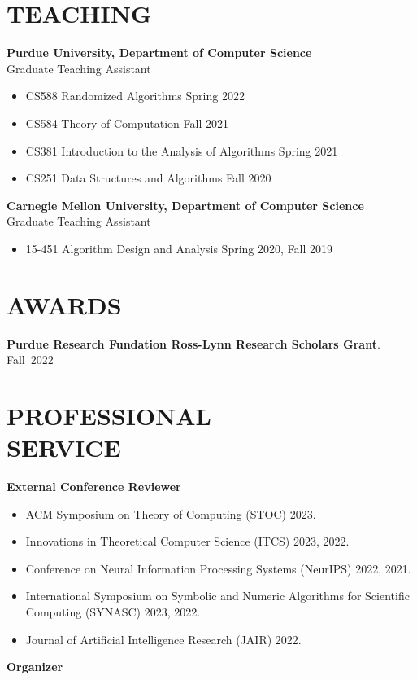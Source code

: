 \documentclass[margin, 10pt]{res} %
\begin{document}
\begin{resume}
\section{TEACHING}

{\bf Purdue University, Department of Computer Science}\\
Graduate Teaching Assistant

\begin{itemize}
\item CS588 Randomized Algorithms \hfill Spring 2022
\item CS584 Theory of Computation \hfill Fall 2021
\item CS381 Introduction to the Analysis of Algorithms \hfill Spring 2021
\item CS251 Data Structures and Algorithms \hfill Fall 2020
\end{itemize}
{\bf Carnegie Mellon University, Department of Computer Science}\\
Graduate Teaching Assistant

\begin{itemize}
\item 15-451 Algorithm Design and Analysis \hfill Spring 2020, Fall 2019
\end{itemize}

\section{AWARDS}
{\bf Purdue Research Fundation Ross-Lynn Research Scholars Grant}. \hfill Fall~2022

\section{PROFESSIONAL \\ SERVICE}

{\bf External Conference Reviewer}

\begin{itemize}
\item ACM Symposium on Theory of Computing (STOC) 2023.
\item Innovations in Theoretical Computer Science (ITCS) 2023, 2022.
\item Conference on Neural Information Processing Systems (NeurIPS) 2022, 2021.
\item International Symposium on Symbolic and Numeric Algorithms for Scientific Computing (SYNASC) 2023, 2022.
\item Journal of Artificial Intelligence Research (JAIR) 2022.
\end{itemize}
{\bf Organizer}


\end{resume}
\end{document}
